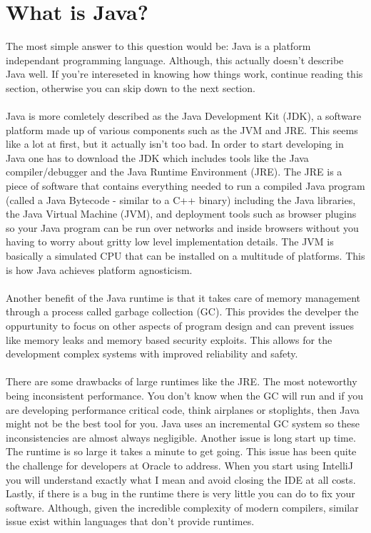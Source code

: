 \documentclass{article}
\begin{document}
\section{What is Java?}
The most simple answer to this question would be: Java is a platform independant programming language.
Although, this actually doesn't describe Java well.
If you're intereseted in knowing how things work, continue reading this section,
otherwise you can skip down to the next section.
\\\\
Java is more comletely described as the Java Development Kit (JDK), a software platform made up of various
components such as the JVM and JRE.
This seems like a lot at first, but it actually isn't too bad. In order to start developing in Java
one has to download the JDK which includes tools like the Java compiler/debugger
and the Java Runtime Environment (JRE). The JRE is a piece of software that contains everything needed to
run a compiled Java program (called a Java Bytecode - similar to a C++ binary) including the Java libraries,
the Java Virtual Machine (JVM), and deployment tools such as browser plugins so your Java program can be run
over networks and inside browsers without you having to worry about gritty low level implementation details.
The JVM is basically a simulated CPU that can be installed on a multitude of platforms. This is how Java 
achieves platform agnosticism.
\\\\
Another benefit of the Java runtime is that it takes care of memory management through a process called garbage
collection (GC). This provides the develper the oppurtunity to focus on other aspects of program design and can prevent
issues like memory leaks and memory based security exploits. This allows for the development complex systems with
improved reliability and safety.
\\\\
There are some drawbacks of large runtimes like the JRE. The most noteworthy being inconsistent performance.
You don't know when the GC will run and if you are developing performance critical code, think
airplanes or stoplights, then Java might not be the best tool for you. Java uses an incremental GC system
so these inconsistencies are almost always negligible. Another issue is long start up time. The runtime is
so large it takes a minute to get going. This issue has been quite the challenge for developers at Oracle to
address. When you start using IntelliJ you will understand exactly what I mean and avoid closing the IDE at all
costs. Lastly, if there is a bug in the runtime there is very little you can do to fix your software. Although,
given the incredible complexity of modern compilers, similar issue exist within languages that don't provide runtimes.
\end{document}
